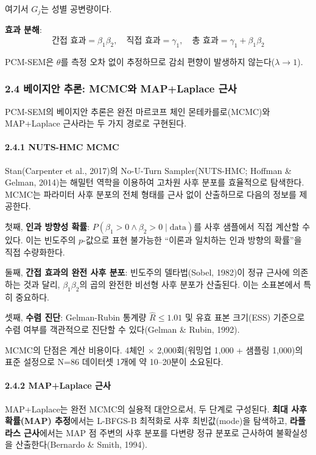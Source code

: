 \documentclass[a4paper,10pt]{oblivoir}
\begin{document}
여기서 $G_j$는 성별 공변량이다.

\textbf{효과 분해}:
\[\text{간접 효과} = \beta_1 \beta_2, \quad \text{직접 효과} = \gamma_1, \quad \text{총 효과} = \gamma_1 + \beta_1\beta_2\]

PCM-SEM은 $\theta$를 측정 오차 없이 추정하므로 감쇠 편향이 발생하지 않는다($\lambda \to 1$).

\subsubsection{2.4 베이지안 추론: MCMC와 MAP+Laplace 근사}

PCM-SEM의 베이지안 추론은 완전 마르코프 체인 몬테카를로(MCMC)와 MAP+Laplace 근사라는 두 가지 경로로 구현된다.

\paragraph{2.4.1 NUTS-HMC MCMC}

Stan(Carpenter et al., 2017)의 No-U-Turn Sampler(NUTS-HMC; Hoffman \& Gelman, 2014)는 해밀턴 역학을 이용하여 고차원 사후 분포를 효율적으로 탐색한다. MCMC는 파라미터 사후 분포의 전체 형태를 근사 없이 산출하므로 다음의 정보를 제공한다.

첫째, \textbf{인과 방향성 확률}: $P(\beta_1 > 0 \wedge \beta_2 > 0 \mid \text{data})$를 사후 샘플에서 직접 계산할 수 있다. 이는 빈도주의 $p$-값으로 표현 불가능한 ``이론과 일치하는 인과 방향의 확률''을 직접 수량화한다.

둘째, \textbf{간접 효과의 완전 사후 분포}: 빈도주의 델타법(Sobel, 1982)이 정규 근사에 의존하는 것과 달리, $\beta_1\beta_2$의 곱의 완전한 비선형 사후 분포가 산출된다. 이는 소표본에서 특히 중요하다.

셋째, \textbf{수렴 진단}: Gelman-Rubin 통계량 $\hat{R} \leq 1.01$ 및 유효 표본 크기(ESS) 기준으로 수렴 여부를 객관적으로 진단할 수 있다(Gelman \& Rubin, 1992).

MCMC의 단점은 계산 비용이다. 4체인 \ensuremath{\times} 2,000회(워밍업 1,000 + 샘플링 1,000)의 표준 설정으로 N=86 데이터셋 1개에 약 10--20분이 소요된다.

\paragraph{2.4.2 MAP+Laplace 근사}

MAP+Laplace는 완전 MCMC의 실용적 대안으로서, 두 단계로 구성된다. \textbf{최대 사후 확률(MAP) 추정}에서는 L-BFGS-B 최적화로 사후 최빈값(mode)을 탐색하고, \textbf{라플라스 근사}에서는 MAP 점 주변의 사후 분포를 다변량 정규 분포로 근사하여 불확실성을 산출한다(Bernardo \& Smith, 1994).
\end{document}
